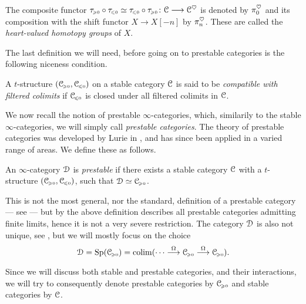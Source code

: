 \begin{definition}
    The composite functor $\tau_{\hspace{-1pt}\scriptscriptstyle\geqslant 0}\circ\tau_{\hspace{-1pt}\scriptscriptstyle\leqslant 0}\simeq\tau_{\hspace{-1pt}\scriptscriptstyle\leqslant 0}\circ\tau_{\hspace{-1pt}\scriptscriptstyle\geqslant 0} \colon \EuScript{C}\longrightarrow \EuScript{C}^\heartsuit$ is denoted by $\pi_0^\heartsuit$ and its composition with the shift functor $X\to X[-n]$ by $\pi_n^\heartsuit$. These are called the \emph{heart-valued homotopy groups} of $X$. 
\end{definition}

The last definition we will need, before going on to prestable categories is the following niceness condition. 

\begin{definition}
    A $t$-structure $(\EuScript{C}_{\hspace{-1pt}\scriptscriptstyle\geqslant 0}, \EuScript{C}_{\hspace{-1pt}\scriptscriptstyle\leqslant 0})$ on a stable category $\EuScript{C}$ is said to be \emph{compatible with filtered colimits} if $\EuScript{C}_{\hspace{-1pt}\scriptscriptstyle\leqslant 0}$ is closed under all filtered colimits in $\EuScript{C}$. 
\end{definition}

We now recall the notion of prestable $\infty$-categories, which, similarily to the stable $\infty$-categories, we will simply call \emph{prestable categories}. The theory of prestable categories was developed by Lurie in \cite[App. C]{lurie_SAG}, and has since been applied in a varied range of areas. We define these as follows. 

\begin{definition}
    An $\infty$-category $\EuScript{D}$ is \emph{prestable} if there exists a stable category $\EuScript{C}$ with a $t$-structure $(\EuScript{C}_{\hspace{-1pt}\scriptscriptstyle\geqslant 0}, \EuScript{C}_{\hspace{-1pt}\scriptscriptstyle\leqslant 0})$, such that $\EuScript{D}\simeq \EuScript{C}_{\hspace{-1pt}\scriptscriptstyle\geqslant 0}$.
\end{definition}

\begin{remark}
    This is not the most general, nor the standard, definition of a prestable category --- see \cite[C.1.2.1]{lurie_SAG} --- but by \cite[C.1.2.9]{lurie_SAG} the above definition describes all prestable categories admitting finite limits, hence it is not a very severe restriction. The category $\EuScript{D}$ is also not unique, see \cite[C.1.2.10]{lurie_SAG}, but we will mostly focus on the choice 
    \[\EuScript{D}=\mathrm{Sp}(\EuScript{C}_{\hspace{-1pt}\scriptscriptstyle\geqslant 0}) = \operatorname{colim} (\cdots\overset{\Omega}{\longrightarrow}\EuScript{C}_{\hspace{-1pt}\scriptscriptstyle\geqslant 0}\overset{\Omega}{\longrightarrow}\EuScript{C}_{\hspace{-1pt}\scriptscriptstyle\geqslant 0}).\]
\end{remark}

Since we will discuss both stable and prestable categories, and their interactions, we will try to consequently denote prestable categories by $\EuScript{C}_{\hspace{-1pt}\scriptscriptstyle\geqslant 0}$ and stable categories by $\EuScript{C}$. 

